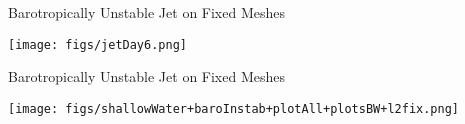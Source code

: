 \begin{slide}
{
   Barotropically Unstable Jet on Fixed Meshes
}

\centering
\texttt{[image: figs/jetDay6.png]}

\end{slide}

\begin{slide}
{
    Barotropically Unstable Jet on Fixed Meshes
}

\centering

\texttt{[image: figs/shallowWater+baroInstab+plotAll+plotsBW+l2fix.png]}

\end{slide}
